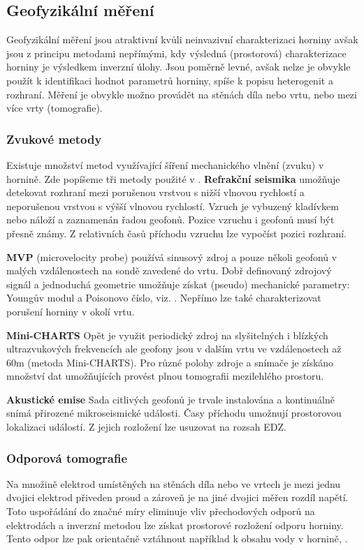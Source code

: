 \documentclass{article}
\begin{document}
\subsection{Geofyzikální měření}
Geofyzikální měření jsou atraktivní kvůli neinvazivní charakterizaci horniny
avšak jsou z principu metodami nepřímými, kdy výsledná (prostorová) charakterizace
horniny je výsledkem inverzní úlohy. Jsou poměrně levné, avšak nelze je obvykle použít k identifikaci 
hodnot parametrů horniny, spíše k popisu heterogenit a rozhraní. Měření je obvykle možno provádět na stěnách díla nebo 
vrtu, nebo mezi více vrty (tomografie).

\subsubsection{Zvukové metody}
Existuje množství metod využívající šíření mechanického vlnění (zvuku) v hornině. Zde popíšeme tři metody použité v \cite{Chandler2002}.
{\bf Refrakční seismika} umožňuje detekovat rozhraní mezi porušenou vrstvou s nižší vlnovou rychlostí a neporušenou vrstvou s výšší vlnovou rychlostí. Vzruch je vybuzený kladívkem nebo náloží a zaznamenán řadou geofonů. 
Pozice vzruchu i geofonů musí být přesně známy. Z relativních časů příchodu vzruchu lze vypočíst pozici rozhraní.

{\bf MVP} (microvelocity probe) používá sinusový zdroj a pouze několi geofonů v malých vzdálenostech na sondě zavedené do vrtu. 
Dobř definovaný zdrojový signál a jednoduchá geometrie umožňuje získat (pseudo) mechanické parametry: Youngův modul a Poisonovo číslo, viz. \cite{Shao2008}. Nepřímo lze také charakterizovat porušení horniny v okolí vrtu.

{\bf Mini-CHARTS} Opět je využit periodický zdroj na slyšitelných i blízkých ultrazvukových frekvencích ale geofony jsou v dalším vrtu ve vzdálenostech až 60m (metoda Mini-CHARTS). Pro různé polohy zdroje a snímače je získáno množství dat umožňujících provést plnou tomografii mezilehlého prostoru.

{\bf  Akustické emise} Sada citlivých geofonů je trvale instalována a kontinuálně snímá přirozené mikroseismické události. Časy příchodu umožnují prostorovou lokalizaci událostí. Z jejich rozložení lze usuzovat na rozsah EDZ.

\subsubsection{Odporová tomografie}
Na množině elektrod umístěných na stěnách díla nebo ve vrtech je mezi jednu dvojici elektrod přiveden proud a zároveň je na jiné dvojici měřen rozdíl napětí. Toto uspořádání do značné míry eliminuje vliv přechodových odporů na elektrodách a inverzní metodou lze získat prostorové rozložení odporu horniny. Tento odpor lze pak orientačně vztáhnout například k obsahu vody v hornině, \cite{Kull2002}.
\end{document}
